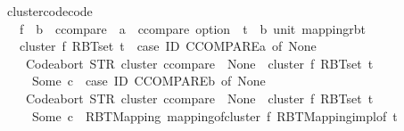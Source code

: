\begin{isabellebody}
\endisatagproof
{\isafoldproof}%
%
\isadelimproof
\isanewline
%
\endisadelimproof
\isanewline
{}\isamarkupfalse%
\ cluster{\isacharunderscore}{\kern0pt}code{\isacharbrackleft}{\kern0pt}code{\isacharbrackright}{\kern0pt}{\isacharcolon}{\kern0pt}\isanewline
\ \ \ f\ {\isacharcolon}{\kern0pt}{\isacharcolon}{\kern0pt}\ {\isachardoublequoteopen}{\isacharprime}{\kern0pt}b\ {\isacharcolon}{\kern0pt}{\isacharcolon}{\kern0pt}\ ccompare\ {\isasymRightarrow}\ {\isacharprime}{\kern0pt}a\ {\isacharcolon}{\kern0pt}{\isacharcolon}{\kern0pt}\ ccompare\ option{\isachardoublequoteclose}\ \ t\ {\isacharcolon}{\kern0pt}{\isacharcolon}{\kern0pt}\ {\isachardoublequoteopen}{\isacharparenleft}{\kern0pt}{\isacharprime}{\kern0pt}b{\isacharcomma}{\kern0pt}\ unit{\isacharparenright}{\kern0pt}\ mapping{\isacharunderscore}{\kern0pt}rbt{\isachardoublequoteclose}\isanewline
\ \ \ {\isachardoublequoteopen}cluster\ f\ {\isacharparenleft}{\kern0pt}RBT{\isacharunderscore}{\kern0pt}set\ t{\isacharparenright}{\kern0pt}\ {\isacharequal}{\kern0pt}\ {\isacharparenleft}{\kern0pt}case\ ID\ CCOMPARE{\isacharparenleft}{\kern0pt}{\isacharprime}{\kern0pt}a{\isacharparenright}{\kern0pt}\ of\ None\ {\isasymRightarrow}\isanewline
\ \ \ \ Code{\isachardot}{\kern0pt}abort\ {\isacharparenleft}{\kern0pt}STR\ {\isacharprime}{\kern0pt}{\isacharprime}{\kern0pt}cluster{\isacharcolon}{\kern0pt}\ ccompare\ {\isacharequal}{\kern0pt}\ None{\isacharprime}{\kern0pt}{\isacharprime}{\kern0pt}{\isacharparenright}{\kern0pt}\ {\isacharparenleft}{\kern0pt}{\isasymlambda}{\isacharunderscore}{\kern0pt}{\isachardot}{\kern0pt}\ cluster\ f\ {\isacharparenleft}{\kern0pt}RBT{\isacharunderscore}{\kern0pt}set\ t{\isacharparenright}{\kern0pt}{\isacharparenright}{\kern0pt}\isanewline
\ \ \ \ {\isacharbar}{\kern0pt}\ Some\ c\ {\isasymRightarrow}\ {\isacharparenleft}{\kern0pt}case\ ID\ CCOMPARE{\isacharparenleft}{\kern0pt}{\isacharprime}{\kern0pt}b{\isacharparenright}{\kern0pt}\ of\ None\ {\isasymRightarrow}\isanewline
\ \ \ \ Code{\isachardot}{\kern0pt}abort\ {\isacharparenleft}{\kern0pt}STR\ {\isacharprime}{\kern0pt}{\isacharprime}{\kern0pt}cluster{\isacharcolon}{\kern0pt}\ ccompare\ {\isacharequal}{\kern0pt}\ None{\isacharprime}{\kern0pt}{\isacharprime}{\kern0pt}{\isacharparenright}{\kern0pt}\ {\isacharparenleft}{\kern0pt}{\isasymlambda}{\isacharunderscore}{\kern0pt}{\isachardot}{\kern0pt}\ cluster\ f\ {\isacharparenleft}{\kern0pt}RBT{\isacharunderscore}{\kern0pt}set\ t{\isacharparenright}{\kern0pt}{\isacharparenright}{\kern0pt}\isanewline
\ \ \ \ {\isacharbar}{\kern0pt}\ Some\ c{\isacharprime}{\kern0pt}\ {\isasymRightarrow}\ {\isacharparenleft}{\kern0pt}RBT{\isacharunderscore}{\kern0pt}Mapping\ {\isacharparenleft}{\kern0pt}mapping{\isacharunderscore}{\kern0pt}of{\isacharunderscore}{\kern0pt}cluster\ f\ {\isacharparenleft}{\kern0pt}RBT{\isacharunderscore}{\kern0pt}Mapping{}{\isachardot}{\kern0pt}impl{\isacharunderscore}{\kern0pt}of\ t{\isacharparenright}{\kern0pt}{\isacharparenright}{\kern0pt}{\isacharparenright}{\kern0pt}{\isacharparenright}{\kern0pt}{\isacharparenright}{\kern0pt}{\isachardoublequoteclose}\isanewline

\end{isabellebody}

